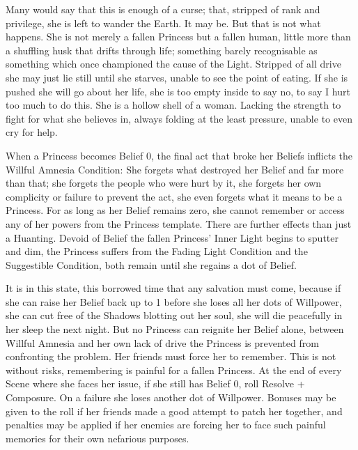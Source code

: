 Many would say that this is enough of a curse; that, stripped of rank and privilege, she is left to wander the Earth. It may be. But that is not what happens. She is not merely a fallen Princess but a fallen human, little more than a shuffling husk that drifts through life; something barely recognisable as something which once championed the cause of the Light. Stripped of all drive she may just lie still until she starves, unable to see the point of eating. If she is pushed she will go about her life, she is too empty inside to say no, to say I hurt too much to do this. She is a hollow shell of a woman. Lacking the strength to fight for what she believes in, always folding at the least pressure, unable to even cry for help. 

When a Princess becomes Belief 0, the final act that broke her Beliefs inflicts the Willful Amnesia Condition: She forgets what destroyed her Belief and far more than that; she forgets the people who were hurt by it, she forgets her own complicity or failure to prevent the act, she even forgets what it means to be a Princess. For as long as her Belief remains zero, she cannot remember or access any of her powers from the Princess template. There are further effects than just a Huanting. Devoid of Belief the fallen Princess' Inner Light begins to sputter and dim, the Princess suffers from the Fading Light Condition and the Suggestible Condition, both remain until she regains a dot of Belief. 

It is in this state, this borrowed time that any salvation must come, because if she can raise her Belief back up to 1 before she loses all her dots of Willpower, she can cut free of the Shadows blotting out her soul, she will die peacefully in her sleep the next night. But no Princess can reignite her Belief alone, between Willful Amnesia and her own lack of drive the Princess is prevented from confronting the problem. Her friends must force her to remember. This is not without risks, remembering is painful for a fallen Princess. At the end of every Scene where she faces her issue, if she still has Belief 0, roll Resolve + Composure. On a failure she loses another dot of Willpower. Bonuses may be given to the roll if her friends made a good attempt to patch her together, and penalties may be applied if her enemies are forcing her to face such painful memories for their own nefarious purposes.

